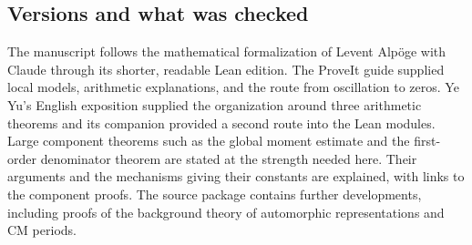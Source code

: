 \subsection{Versions and what was checked}
The manuscript follows the mathematical formalization of Levent Alpöge with Claude through its shorter, readable Lean edition. The ProveIt guide supplied local models, arithmetic explanations, and the route from oscillation to zeros. Ye Yu's English exposition supplied the organization around three arithmetic theorems and its companion provided a second route into the Lean modules. Large component theorems such as the global moment estimate and the first-order denominator theorem are stated at the strength needed here. Their arguments and the mechanisms giving their constants are explained, with links to the component proofs. The source package contains further developments, including proofs of the background theory of automorphic representations and CM periods.

